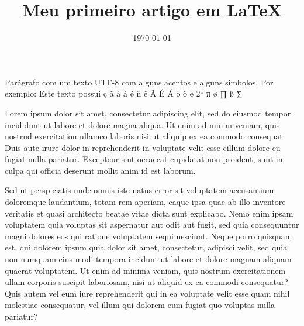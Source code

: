 \documentclass{article}
\title{Meu primeiro artigo em \LaTeX}
\date{\today}
\begin{document}
\maketitle

Parágrafo com um texto UTF-8 com alguns acentos e alguns simbolos.  
Por exemplo: Este texto possui ç ã á à é ñ ê Ã É Á ò õ e 2º π ø ∏ ß ∑ 


Lorem ipsum dolor sit amet, consectetur adipiscing elit, sed do eiusmod tempor incididunt ut labore et dolore magna aliqua. Ut enim ad minim veniam, quis nostrud exercitation ullamco laboris nisi ut aliquip ex ea commodo consequat. Duis aute irure dolor in reprehenderit in voluptate velit esse cillum dolore eu fugiat nulla pariatur. Excepteur sint occaecat cupidatat non proident, sunt in culpa qui officia deserunt mollit anim id est laborum. %

Sed ut perspiciatis unde omnis iste natus error sit voluptatem accusantium doloremque laudantium, totam rem aperiam, eaque ipsa quae ab illo inventore veritatis et quasi architecto beatae vitae dicta sunt explicabo. Nemo enim ipsam voluptatem quia voluptas sit aspernatur aut odit aut fugit, sed quia consequuntur magni dolores eos qui ratione voluptatem sequi nesciunt. Neque porro quisquam est, qui dolorem ipsum quia dolor sit amet, consectetur, adipisci velit, sed quia non numquam eius modi tempora incidunt ut labore et dolore magnam aliquam quaerat voluptatem. Ut enim ad minima veniam, quis nostrum exercitationem ullam corporis suscipit laboriosam, nisi ut aliquid ex ea commodi consequatur? Quis autem vel eum iure reprehenderit qui in ea voluptate velit esse quam nihil molestiae consequatur, vel illum qui dolorem eum fugiat quo voluptas nulla pariatur?
\end{document}
